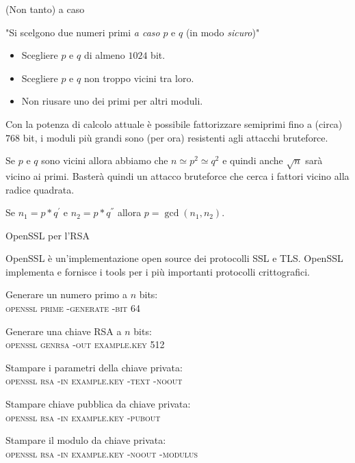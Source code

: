 \documentclass[handout, xcolor=dvipsnames,aspectratio=169]{beamer}
\begin{document}
\begin{frame}{(Non tanto) a caso}

\pause

"Si scelgono due numeri primi \textit{a caso} $p$ e $q$ (in modo \textit{sicuro})"

\begin{itemize}
  \item Scegliere $p$ e $q$ di almeno $1024$ bit.
  \item Scegliere $p$ e $q$ non troppo vicini tra loro.
  \item Non riusare uno dei primi per altri moduli.
\end{itemize}

\smallskip
\pause
Con la potenza di calcolo attuale è possibile fattorizzare semiprimi fino a (circa) $768$ bit, i moduli più grandi sono (per ora) resistenti agli attacchi bruteforce.

\smallskip
\pause
Se $p$ e $q$ sono vicini allora abbiamo che $n \simeq p^2 \simeq q^2$ e quindi anche $\sqrt{n}$ sarà vicino ai primi. Basterà quindi un attacco bruteforce che cerca i fattori vicino alla radice quadrata.

\smallskip
\pause

Se $n_1 = p*q^{'}$ e $n_2 = p*q^{''}$ allora $p = \gcd(n_1, n_2)$.

\end{frame}

\begin{frame}{OpenSSL per l'RSA}

OpenSSL è un'implementazione open source dei protocolli SSL e TLS. OpenSSL implementa e fornisce i tools per i più importanti protocolli crittografici.

\medskip

Generare un numero primo a $n$ bits:\\ \phantom{ - } \textsc{openssl prime -generate -bit 64}

Generare una chiave RSA a $n$ bits:\\ \phantom{ - } \textsc{openssl genrsa -out example.key 512}

Stampare i parametri della chiave privata:\\ \phantom{ - } \textsc{openssl rsa -in example.key -text -noout}

Stampare chiave pubblica da chiave privata:\\ \phantom{ - } \textsc{openssl rsa -in example.key -pubout}

Stampare il modulo da chiave privata:\\ \phantom{ - } \textsc{openssl rsa -in example.key -noout -modulus}


\end{frame}
\end{document}
